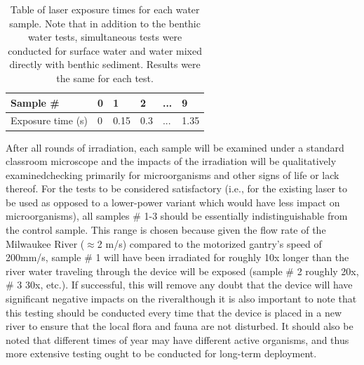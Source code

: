 \documentclass[fleqn,10pt]{SelfArx} %
\begin{document}
	\begin{table}[h]
		\begin{tabular}{|l|l|l|l|l|l|}
			\hline
			Sample \#         & 0 & 1    & 2   & ... & 9    \\ \hline
			Exposure time (s) & 0 & 0.15 & 0.3 & ... & 1.35 \\ \hline
		\end{tabular}
		\caption[Laser Exposure Time Table]{Table of laser exposure times for each water sample. Note that in addition to the benthic water tests, simultaneous tests were conducted for surface water and water mixed directly with benthic sediment. Results were the same for each test.}
	\end{table}
	
	After all rounds of irradiation, each sample will be examined under a standard classroom microscope and the impacts of the irradiation will be qualitatively examined\textemdash checking primarily for microorganisms and other signs of life or lack thereof. For the tests to be considered satisfactory (i.e., for the existing laser to be used as opposed to a lower-power variant which would have less impact on microorganisms), all samples \# 1-3 should be essentially indistinguishable from the control sample. This range is chosen because given the flow rate of the Milwaukee River ($\approx$2 m/s) compared to the motorized gantry’s speed of 200mm/s, sample \# 1 will have been irradiated for roughly 10x longer than the river water traveling through the device will be exposed (sample \# 2 roughly 20x, \# 3 30x, etc.). If successful, this will remove any doubt that the device will have significant negative impacts on the river\textemdash although it is also important to note that this testing should be conducted every time that the device is placed in a new river to ensure that the local flora and fauna are not disturbed. It should also be noted that different times of year may have different active organisms, and thus more extensive testing ought to be conducted for long-term deployment.
	
\end{document}
